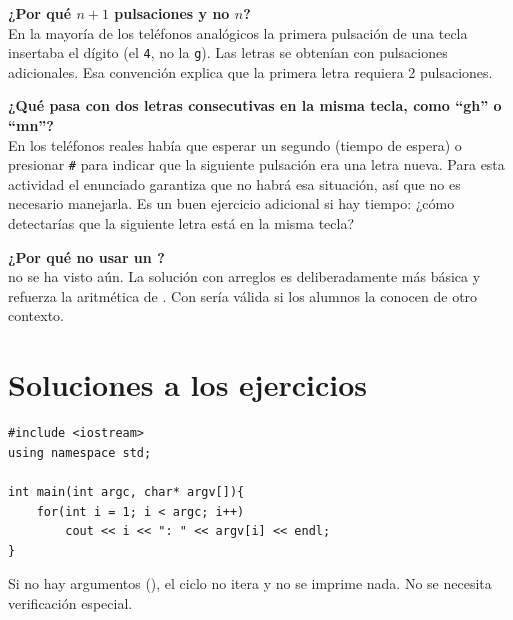 \documentclass[12pt, oneside]{article}
\begin{document}
\begin{notaprofesor}

  \textbf{¿Por qué $n+1$ pulsaciones y no $n$?}\\
  En la mayoría de los teléfonos analógicos la primera pulsación
  de una tecla insertaba el dígito (el \texttt{4}, no la \texttt{g}).
  Las letras se obtenían con pulsaciones adicionales.  Esa convención
  explica que la primera letra requiera 2 pulsaciones.

  \medskip
  \textbf{¿Qué pasa con dos letras consecutivas en la misma tecla,
  como ``gh'' o ``mn''?}\\
  En los teléfonos reales había que esperar un segundo (tiempo de
  espera) o presionar \texttt{\#} para indicar que la siguiente
  pulsación era una letra nueva.  Para esta actividad el enunciado
  garantiza que no habrá esa situación, así que no es necesario
  manejarla.  Es un buen ejercicio adicional si hay tiempo: ¿cómo
  detectarías que la siguiente letra está en la misma tecla?

  \medskip
  \textbf{¿Por qué no usar un ?}\\
   no se ha visto aún.  La solución con arreglos es
  deliberadamente más básica y refuerza la aritmética de .
  Con  sería válida si los alumnos la conocen de otro contexto.

\end{notaprofesor}

\section{Soluciones a los ejercicios}

\begin{notaprofesor}
\begin{verbatim}
#include <iostream>
using namespace std;

int main(int argc, char* argv[]){
    for(int i = 1; i < argc; i++)
        cout << i << ": " << argv[i] << endl;
}
\end{verbatim}
  Si no hay argumentos (), el ciclo no itera y no
  se imprime nada.  No se necesita verificación especial.
\end{notaprofesor}
\end{document}
